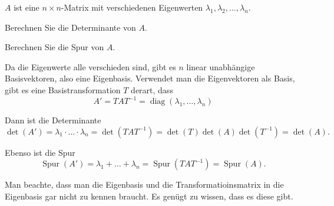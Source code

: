 $A$ ist eine $n\times n$-Matrix mit verschiedenen Eigenwerten
$\lambda_1,\lambda_2,\dots,\lambda_n$.
\begin{teilaufgaben}
\item
Berechnen Sie die Determinante von $A$.
\item
Berechnen Sie die Spur von $A$.
\end{teilaufgaben}


\begin{loesung}
Da die Eigenwerte alle verschieden sind, gibt es $n$ linear unabhängige
Basisvektoren, also eine Eigenbasis.
Verwendet man die Eigenvektoren als Basis, gibt es eine Basistransformation
$T$ derart, dass
\[
A'=TAT^{-1}=\operatorname{diag}(\lambda_1,\dots,\lambda_n)
\]
\begin{teilaufgaben}
\item
Dann ist die Determinante
\[
\det(A')
=
\lambda_1\cdot \ldots \cdot\lambda_n
=
\det(TAT^{-1})
=
\det(T)\det(A)\det(T^{-1})
=
\det(A).
\]
\item
Ebenso ist die Spur
\[
\operatorname{Spur}(A')
=
\lambda_1+ \ldots +\lambda_n
=
\operatorname{Spur}(TAT^{-1})
=
\operatorname{Spur}(A).
\]
\end{teilaufgaben}
Man beachte, dass man die Eigenbasis und die Transformatioinsmatrix in die
Eigenbasis gar nicht zu kennen braucht.
Es genügt zu wissen, dass es diese gibt.
\qedhere
\end{loesung}
